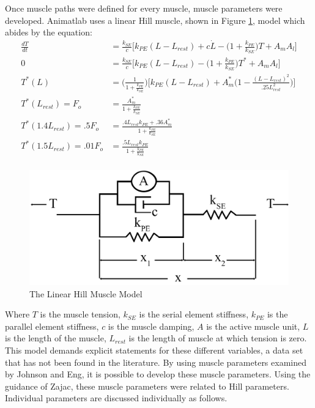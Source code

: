 \documentclass[runningheads,a4paper]{llncs}
\begin{document}
Once muscle paths were defined for every muscle, muscle parameters were developed. Animatlab uses a linear Hill muscle, shown in Figure \ref{fig:hill}, model which abides by the equation:
	\begin{align*}
			\frac{dT}{dt} &= \frac{k_{SE}}{c}\bigg[k_{PE}(L-L_{rest})+c \dot{L}-\big(1+\frac{k_{PE}}{k_{SE}}\big)T+A_{m}A_{l}\bigg] \\
			0 &= \frac{k_{SE}}{c}\bigg[k_{PE}(L-L_{rest})-\big(1+\frac{k_{PE}}{k_{SE}}\big)T^{*}+A_{m}A_{l}\bigg] \\
			T^{*}(L) &= \bigg(\frac{1}{1+\frac{k_{PE}}{k_{SE}}}\bigg)\bigg[k_{PE}(L-L_{rest})+A_{m}^{*}\bigg(1-\frac{(L-L_{rest})^2}{.25 L_{rest}^2}\bigg)\bigg] \\
			T^{*}(L_{rest}) = F_{o} &= \frac{A_{m}^{*}}{1+\frac{k_{PE}}{k_{SE}}} \\
			T^{*}(1.4 L_{rest}) = .5 F_{o} &=  \frac{.4 L_{rest} k_{PE}+.36A_{m}^{*}}{1+\frac{k_{PE}}{k_{SE}}} \\
			T^{*}(1.5 L_{rest}) = .01 F_{o} &=  \frac{.5 L_{rest} k_{PE}}{1+\frac{k_{PE}}{k_{SE}}} \\
	\end{align*}
	\begin{figure}
		\centering
		\includegraphics[width=.8\textwidth]{Figures/hill1.png}
		\caption{The Linear Hill Muscle Model}
		\label{fig:hill}
	\end{figure} \par
Where $T$ is the muscle tension, $k_{SE}$ is the serial element stiffness, $k_{PE}$ is the parallel element stiffness, $c$ is the muscle damping, $A$ is the active muscle unit, $L$ is the length of the muscle, $L_{rest}$ is the length of muscle at which tension is zero. This model demands explicit statements for these different variables, a data set that has not been found in the literature. By using muscle parameters examined by Johnson\cite{johnson_application_2011} and Eng\cite{eng_scaling_2008}, it is possible to develop these muscle parameters. Using the guidance of Zajac\cite{zajac_muscle_1989}, these muscle parameters were related to Hill parameters. Individual parameters are discussed individually as follows. \par
\end{document}
